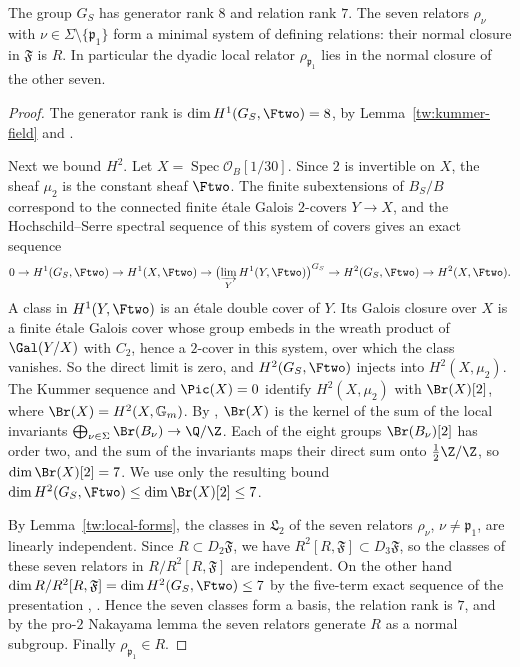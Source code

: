 \begin{lemma}\label{tw:complete-global-presentation}
The group $G_S$ has generator rank $8$ and relation rank $7$. The
seven relators $\rho_\nu$ with $\nu\in\Sigma\setminus\{\mathfrak p_1\}$ form
a minimal system of defining relations: their normal closure in
$\mathfrak F$ is $R$. In particular the dyadic local relator
$\rho_{\mathfrak p_1}$ lies in the normal closure of the other seven.
\end{lemma}

\begin{proof}
The generator rank is $\dim H^1(G_S,\Ftwo)=8$, by
Lemma~\ref{tw:kummer-field} and
\cite[Proposition~3.9.1]{NeukirchSchmidtWingberg2008}.

Next we bound $H^2$. Let $X=\operatorname{Spec}\mathcal O_B[1/30]$. Since
$2$ is invertible on $X$, the sheaf $\mu_2$ is the constant sheaf $\Ftwo$.
The finite subextensions of $B_S/B$ correspond to the connected finite étale
Galois $2$-covers $Y\to X$, and the Hochschild--Serre spectral sequence of
this system of covers \cite[Theorem~14.9 and Remark~14.10]{MilneEtale} gives an exact
sequence
\[
 0\to H^1(G_S,\Ftwo)\to H^1(X,\Ftwo)\to
 \bigl(\varinjlim_Y H^1(Y,\Ftwo)\bigr)^{G_S}\to
 H^2(G_S,\Ftwo)\to H^2(X,\Ftwo).
\]
A class in $H^1(Y,\Ftwo)$ is an étale double cover of $Y$. Its Galois closure
over $X$ is a finite étale Galois cover whose group embeds in the wreath
product of $\Gal(Y/X)$ with $C_2$, hence a $2$-cover in this system, over which
the class vanishes. So the direct limit is zero, and
$H^2(G_S,\Ftwo)$ injects into $H^2(X,\mu_2)$. The Kummer sequence and
$\Pic(X)=0$ identify $H^2(X,\mu_2)$ with $\Br(X)[2]$, where
$\Br(X)=H^2(X,\mathbb G_m)$. By \cite[Theorem~6.8.3 and
Example~6.9.4]{Poonen}, $\Br(X)$ is the kernel of the sum of the local
invariants $\bigoplus_{\nu\in\Sigma}\Br(B_\nu)\to\Q/\Z$. Each of the eight
groups $\Br(B_\nu)[2]$ has order two, and the sum of the invariants maps their
direct sum onto $\frac12\Z/\Z$, so $\dim\Br(X)[2]=7$. We use only the
resulting bound $\dim H^2(G_S,\Ftwo)\le\dim\Br(X)[2]\le7$.

By Lemma~\ref{tw:local-forms}, the classes in $\mathfrak L_2$ of the seven
relators $\rho_\nu$, $\nu\ne\mathfrak p_1$, are linearly independent. Since
$R\subset D_2\mathfrak F$, we have $R^2[R,\mathfrak F]\subset D_3\mathfrak F$, so
the classes of these seven relators in $R/R^2[R,\mathfrak F]$ are independent.
On the other hand
$\dim R/R^2[R,\mathfrak F]=\dim H^2(G_S,\Ftwo)\le7$ by the five-term
exact sequence of the presentation
\cite[Proposition~3.9.5]{NeukirchSchmidtWingberg2008},
\cite[(3.3)--(3.4)]{Quadrelli2021}. Hence the seven classes form a basis, the
relation rank is $7$, and by the pro-$2$ Nakayama lemma
\cite[Corollary~3.9.3]{NeukirchSchmidtWingberg2008} the seven relators
generate $R$ as a normal subgroup. Finally $\rho_{\mathfrak p_1}\in R$.
\end{proof}

